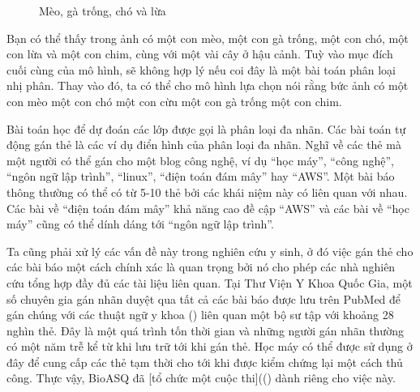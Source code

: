 \documentclass[letterpaper,11pt,english]{sphinxmanual}
\let\sphinxpxdimen\pdfpxdimen\else\newdimen\sphinxpxdimen
\begin{document}
\begin{figure}[H]
\centering
\capstart

\noindent\sphinxincludegraphics[width=300\sphinxpxdimen]{{stackedanimals}.jpg}
\caption{Mèo, gà trống, chó và lừa}\label{\detokenize{chapter_introduction/index_vn:id13}}\label{\detokenize{chapter_introduction/index_vn:subsec-recommender-systems}}\end{figure}



Bạn có thể thấy trong ảnh có một con mèo, một con gà trống, một con chó,
một con lừa và một con chim, cùng với một vài cây ở hậu cảnh. Tuỳ vào
mục đích cuối cùng của mô hình, sẽ không hợp lý nếu coi đây là một bài
toán phân loại nhị phân. Thay vào đó, ta có thể cho mô hình lựa chọn nói
rằng bức ảnh có một con mèo  một con chó  một con cừu  một
con gà trống  một con chim.



Bài toán học để dự đoán các lớp  được gọi là phân loại
đa nhãn. Các bài toán tự động gán thẻ là các ví dụ điển hình của phân
loại đa nhãn. Nghĩ về các thẻ mà một người có thể gán cho một blog công
nghệ, ví dụ “học máy”, “công nghệ”, “ngôn ngữ lập trình”, “linux”, “điện
toán đám mây” hay “AWS”. Một bài báo thông thường có thể có từ 5-10 thẻ
bởi các khái niệm này có liên quan với nhau. Các bài về “điện toán đám
mây” khả năng cao đề cập “AWS” và các bài về “học máy” cũng có thể dính
dáng tới “ngôn ngữ lập trình”.





Ta cũng phải xử lý các vấn đề này trong nghiên cứu y sinh, ở đó việc gán
thẻ cho các bài báo một cách chính xác là quan trọng bởi nó cho phép các
nhà nghiên cứu tổng hợp đầy đủ các tài liệu liên quan. Tại Thư Viện Y
Khoa Quốc Gia, một số chuyên gia gán nhãn duyệt qua tất cả các bài báo
được lưu trên PubMed để gán chúng với các thuật ngữ y khoa () liên
quan \textendash{} một bộ sư tập với khoảng 28 nghìn thẻ. Đây là một quá trình tốn
thời gian và những người gán nhãn thường có một năm trễ kể từ khi lưu
trữ tới khi gán thẻ. Học máy có thể được sử dụng ở đây để cung cấp các
thẻ tạm thời cho tới khi được kiểm chứng lại một cách thủ công. Thực
vậy, BioASQ đã {[}tổ chức một cuộc thi{]}(() dành riêng
cho việc này.
\end{document}
